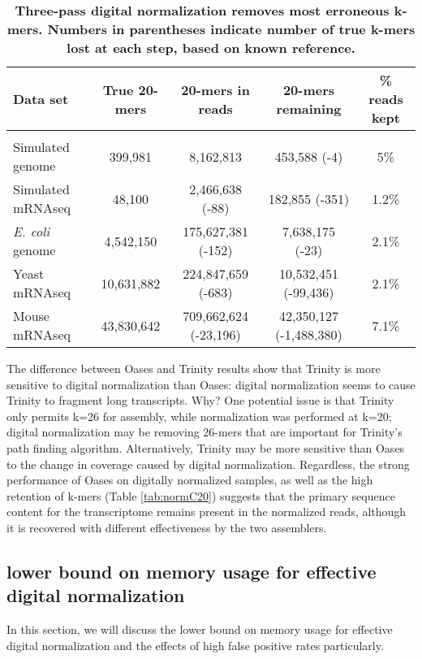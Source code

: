 \begin{table}[!ht]
\small
\caption{
\bf{Three-pass digital normalization removes most erroneous k-mers.  Numbers
in parentheses indicate number of true k-mers lost at each step, based on known reference.}}
\begin{tabular}{|l|c|c|c|c|}
Data set & True 20-mers & 20-mers in reads & 20-mers remaining & \% reads kept\\
\hline \\
Simulated genome & 399,981 & 8,162,813 & 453,588 (-4) & 5\% \\
Simulated mRNAseq & 48,100 & 2,466,638 (-88) & 182,855 (-351) & 1.2\% \\
{\em E. coli} genome & 4,542,150 & 175,627,381 (-152) & 7,638,175 (-23) & 2.1\% \\
Yeast mRNAseq & 10,631,882 & 224,847,659 (-683) & 10,532,451 (-99,436) & 2.1\% \\
Mouse mRNAseq & 43,830,642 & 709,662,624 (-23,196) & 42,350,127 (-1,488,380) & 7.1\% \\
\end{tabular}
\begin{flushleft}
\end{flushleft}
\label{tab:normC5}
\end{table}

% 
The difference between Oases and Trinity results show that Trinity is more
sensitive to digital normalization than Oases: digital normalization seems to
cause Trinity to fragment long transcripts. Why?  One potential issue is that
Trinity only permits k=26 for assembly, while normalization was performed at
k=20; digital normalization may be removing 26-mers that are important for
Trinity's path finding algorithm.  Alternatively, Trinity may be more sensitive
than Oases to the change in coverage caused by digital normalization.
Regardless, the strong performance of Oases on digitally normalized samples, as
well as the high retention of k-mers (Table \ref{tab:normC20}) suggests that
the primary sequence content for the transcriptome remains present in the
normalized reads, although it is recovered with different effectiveness by the
two assemblers.


\subsection{lower bound on memory usage for effective digital normalization}

In this section, we will discuss the lower bound on memory usage for effective digital
normalization and the effects of high false positive rates particularly.

